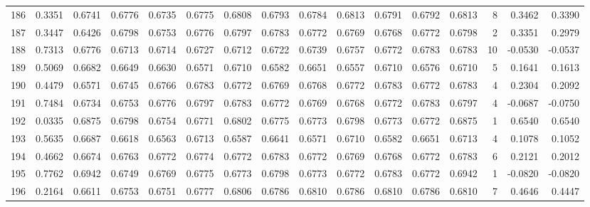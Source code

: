 \begin{tabular}{lrrrrrrrrrrrrrrr}
186 &      0.3351 &  0.6741 &  0.6776 &  0.6735 &  0.6775 &  0.6808 &  0.6793 &  0.6784 &  0.6813 &  0.6791 &   0.6792 &     0.6813 &      8 &                    0.3462 &                     0.3390 \\
187 &      0.3447 &  0.6426 &  0.6798 &  0.6753 &  0.6776 &  0.6797 &  0.6783 &  0.6772 &  0.6769 &  0.6768 &   0.6772 &     0.6798 &      2 &                    0.3351 &                     0.2979 \\
188 &      0.7313 &  0.6776 &  0.6713 &  0.6714 &  0.6727 &  0.6712 &  0.6722 &  0.6739 &  0.6757 &  0.6772 &   0.6783 &     0.6783 &     10 &                   -0.0530 &                    -0.0537 \\
189 &      0.5069 &  0.6682 &  0.6649 &  0.6630 &  0.6571 &  0.6710 &  0.6582 &  0.6651 &  0.6557 &  0.6710 &   0.6576 &     0.6710 &      5 &                    0.1641 &                     0.1613 \\
190 &      0.4479 &  0.6571 &  0.6745 &  0.6766 &  0.6783 &  0.6772 &  0.6769 &  0.6768 &  0.6772 &  0.6783 &   0.6772 &     0.6783 &      4 &                    0.2304 &                     0.2092 \\
191 &      0.7484 &  0.6734 &  0.6753 &  0.6776 &  0.6797 &  0.6783 &  0.6772 &  0.6769 &  0.6768 &  0.6772 &   0.6783 &     0.6797 &      4 &                   -0.0687 &                    -0.0750 \\
192 &      0.0335 &  0.6875 &  0.6798 &  0.6754 &  0.6771 &  0.6802 &  0.6775 &  0.6773 &  0.6798 &  0.6773 &   0.6772 &     0.6875 &      1 &                    0.6540 &                     0.6540 \\
193 &      0.5635 &  0.6687 &  0.6618 &  0.6563 &  0.6713 &  0.6587 &  0.6641 &  0.6571 &  0.6710 &  0.6582 &   0.6651 &     0.6713 &      4 &                    0.1078 &                     0.1052 \\
194 &      0.4662 &  0.6674 &  0.6763 &  0.6772 &  0.6774 &  0.6772 &  0.6783 &  0.6772 &  0.6769 &  0.6768 &   0.6772 &     0.6783 &      6 &                    0.2121 &                     0.2012 \\
195 &      0.7762 &  0.6942 &  0.6749 &  0.6769 &  0.6775 &  0.6773 &  0.6798 &  0.6773 &  0.6772 &  0.6783 &   0.6772 &     0.6942 &      1 &                   -0.0820 &                    -0.0820 \\
196 &      0.2164 &  0.6611 &  0.6753 &  0.6751 &  0.6777 &  0.6806 &  0.6786 &  0.6810 &  0.6786 &  0.6810 &   0.6786 &     0.6810 &      7 &                    0.4646 &                     0.4447 \\

\end{tabular}

